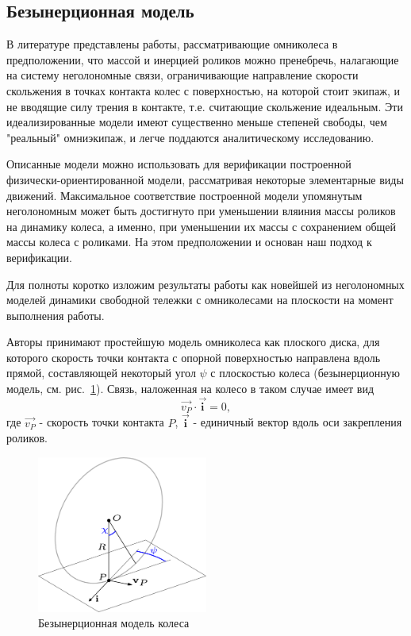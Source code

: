 \subsection{Безынерционная модель}

В литературе представлены \cite{Borisov2011, formalskii, ZobovaTatarinovPMM} работы, рассматривающие омниколеса в предположении, что массой и инерцией роликов можно пренебречь, налагающие на систему неголономные связи, ограничивающие направление скорости скольжения в точках контакта колес с поверхностью, на которой стоит экипаж, и не вводящие силу трения в контакте, т.е. считающие скольжение идеальным. Эти идеализированные модели имеют существенно меньше степеней свободы, чем "реальный" омниэкипаж, и легче поддаются аналитическому исследованию.

Описанные модели можно использовать для верификации построенной физически-ориентированной модели, рассматривая некоторые элементарные виды движений. Максимальное соответствие построенной модели упомянутым неголономным может быть достигнуто при уменьшении вляиния массы роликов на динамику колеса, а именно, при уменьшении их массы с сохранением общей массы колеса с роликами. На этом предположении и основан наш подход к верификации.

Для полноты коротко изложим результаты работы \cite{Borisov2011} как новейшей из неголономных моделей динамики свободной тележки с омниколесами на плоскости на момент выполнения работы.

Авторы \cite{Borisov2011} принимают простейшую модель омниколеса как плоского диска, для которого скорость точки контакта с опорной поверхностью направлена вдоль прямой, составляющей некоторый угол $\psi$ с плоскостью колеса (безынерционную модель, см. рис.~\ref{fig:bor_wheel_scheme}). Связь, наложенная на колесо в таком случае имеет вид
$$\vec{v_P}\cdot\vec{\mathbf{i}} = 0,$$
где $\vec{v_P}$ - скорость точки контакта $P$, $\vec{\mathbf{i}}$ - единичный вектор вдоль оси закрепления роликов.\\

\begin{figure}[ht!]
    \centering
    \includegraphics[width=0.5\textwidth]{content/pic/asy/wheel_bor.png}
    \caption{Безынерционная модель колеса}
    \label{fig:bor_wheel_scheme}
\end{figure}

